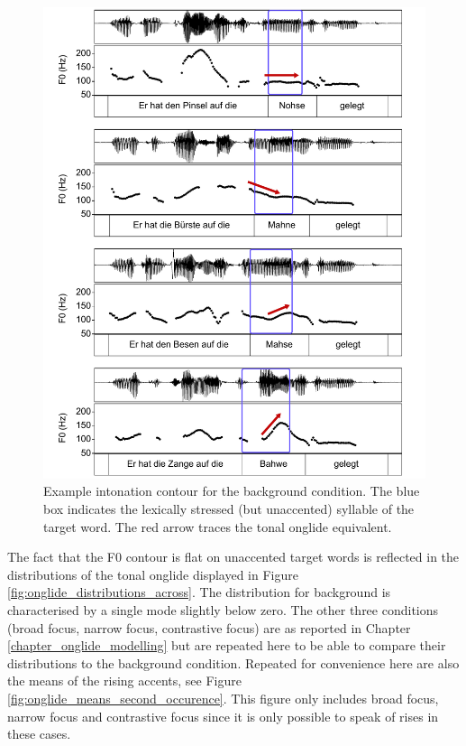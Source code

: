 \begin{figure}[htbp]
\begin{center}
\includegraphics[width=\textwidth]{figures/ch7/intonation_contour_background.pdf}
\caption[Example intonation contour for the background condition.]{Example intonation contour for the background condition. The blue box indicates the lexically stressed (but unaccented) syllable of the target word. The red arrow traces the tonal onglide equivalent.}
\label{fig:contour_background}
\end{center}
\end{figure}

The fact that the F0 contour is flat on unaccented target words is reflected in the distributions of the tonal onglide displayed in Figure \ref{fig:onglide_distributions_across}. The distribution for background is characterised by a single mode slightly below zero. The other three conditions (broad focus, narrow focus, contrastive focus) are as reported in Chapter \ref{chapter_onglide_modelling} but are repeated here to be able to compare their distributions to the background condition. Repeated for convenience here are also the means of the rising accents, see Figure \ref{fig:onglide_means_second_occurence}. This figure only includes broad focus, narrow focus and contrastive focus since it is only possible to speak of rises in these cases. 

